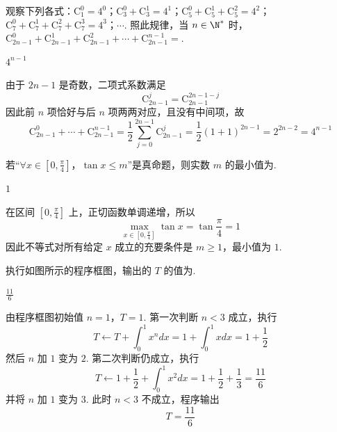 \begin{problem}
观察下列各式：\(\mathrm C_1^0 = 4^0\)；\(\mathrm C_3^0 + \mathrm C_3^1 = 4^1\)；\(\mathrm C_5^0 + \mathrm C_5^1 + \mathrm C_5^2 = 4^2\)；\(\mathrm C_7^0 + \mathrm C_7^1 + \mathrm C_7^2 + \mathrm C_7^3 = 4^3\)；\(\cdots\). 照此规律，当 \(n \in \N^*\) 时，\(\mathrm C_{2n-1}^0 + \mathrm C_{2n-1}^1 + \mathrm C_{2n-1}^2 + \cdots + \mathrm C_{2n-1}^{n-1} =\)\fillinblank{}.
\end{problem}

\begin{answer}
\(4^{n-1}\)
\end{answer}

\begin{solution}
由于 \(2n-1\) 是奇数，二项式系数满足
\[
\mathrm C_{2n-1}^{j}=\mathrm C_{2n-1}^{2n-1-j}
\]
因此前 \(n\) 项恰好与后 \(n\) 项两两对应，且没有中间项，故
\[
\mathrm C_{2n-1}^0+\cdots+\mathrm C_{2n-1}^{n-1}
=\frac12\sum_{j=0}^{2n-1}\mathrm C_{2n-1}^{j}
=\frac12(1+1)^{2n-1}=2^{2n-2}=4^{n-1}
\]
\end{solution}

\begin{problem}
若“\(\forall x \in \left[0,\frac{\pi}{4}\right]\)，\(\tan x \leqslant m\)”是真命题，则实数 \(m\) 的最小值为\fillinblank{}.
\end{problem}

\begin{answer}
\(1\)
\end{answer}

\begin{solution}
在区间 \(\left[0,\frac{\pi}{4}\right]\) 上，正切函数单调递增，所以
\[
\max_{x\in[0,\frac{\pi}{4}]}\tan x=\tan\frac{\pi}{4}=1
\]
因此不等式对所有给定 \(x\) 成立的充要条件是 \(m\geqslant1\)，最小值为 \(1\).
\end{solution}

\begin{problem}
执行如图所示的程序框图，输出的 \(T\) 的值为\fillinblank{}.

\end{problem}

\begin{answer}
\(\frac{11}{6}\)
\end{answer}

\begin{solution}
由程序框图初始值 \(n=1\)，\(T=1\). 第一次判断 \(n<3\) 成立，执行
\[
T\leftarrow T+\int_0^1x^n dx
=1+\int_0^1x dx=1+\frac12
\]
然后 \(n\) 加 \(1\) 变为 \(2\). 第二次判断仍成立，执行
\[
T\leftarrow1+\frac12+\int_0^1x^2 dx
=1+\frac12+\frac13=\frac{11}{6}
\]
并将 \(n\) 加 \(1\) 变为 \(3\). 此时 \(n<3\) 不成立，程序输出
\[
T=\frac{11}{6}
\]
\end{solution}

